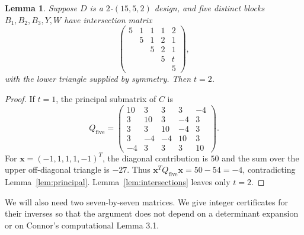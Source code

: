 \documentclass[11pt]{article}
\newcommand\Zx{{\mathbf x}}
\newcommand\pmat[1]{\begin{pmatrix} #1 \end{pmatrix}}
\newtheorem{lemma}[theorem]{Lemma}
\theoremstyle{definition}
\begin{document}
\begin{lemma}\label{lem:five}
\textup{\cite[Lemma 4.5, at $k=5$]{HC}}
Suppose $D$ is a $2$-$(15,5,2)$ design, and five distinct blocks
$B_1,B_2,B_3,Y,W$ have intersection matrix
\[
 \pmat{5&1&1&1&2\\&5&1&2&1\\&&5&2&1\\&&&5&t\\&&&&5},
\]
with the lower triangle supplied by symmetry. Then $t=2$.
\end{lemma}
\begin{proof}
If $t=1$, the principal submatrix of $C$ is
\[
 Q_{\mathrm{five}}=
 \begin{pmatrix}
 10&3&3&3&-4\\3&10&3&-4&3\\3&3&10&-4&3\\
 3&-4&-4&10&3\\-4&3&3&3&10
 \end{pmatrix}.
\]
For $\Zx=(-1,1,1,1,-1)^T$, the diagonal contribution is $50$ and
the sum over the upper off-diagonal triangle is $-27$.
Thus $\Zx^TQ_{\mathrm{five}}\Zx=50-54=-4$, contradicting
Lemma~\ref{lem:principal}. Lemma~\ref{lem:intersections} leaves only
$t=2$.
\end{proof}

We will also need two seven-by-seven matrices. We give integer
certificates for their inverses so that the argument does not depend
on a determinant expansion or on Connor's computational Lemma 3.1.
\end{document}
